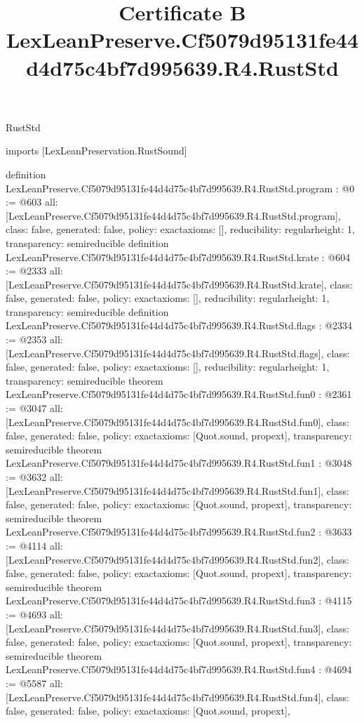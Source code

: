 \begin{lexlean}{RustStd}
\title{Certificate B LexLeanPreserve.Cf5079d95131fe44d4d75c4bf7d995639.R4.RustStd}
\begin{coremodule}
imports [LexLeanPreservation.RustSound]

definition LexLeanPreserve.Cf5079d95131fe44d4d75c4bf7d995639.R4.RustStd.program : @0 := @603 {
  all: [LexLeanPreserve.Cf5079d95131fe44d4d75c4bf7d995639.R4.RustStd.program],
  class: false,
  generated: false,
  policy: exact{axioms: []},
  reducibility: regular{height: 1},
  transparency: semireducible
}
definition LexLeanPreserve.Cf5079d95131fe44d4d75c4bf7d995639.R4.RustStd.krate : @604 := @2333 {
  all: [LexLeanPreserve.Cf5079d95131fe44d4d75c4bf7d995639.R4.RustStd.krate],
  class: false,
  generated: false,
  policy: exact{axioms: []},
  reducibility: regular{height: 1},
  transparency: semireducible
}
definition LexLeanPreserve.Cf5079d95131fe44d4d75c4bf7d995639.R4.RustStd.flags : @2334 := @2353 {
  all: [LexLeanPreserve.Cf5079d95131fe44d4d75c4bf7d995639.R4.RustStd.flags],
  class: false,
  generated: false,
  policy: exact{axioms: []},
  reducibility: regular{height: 1},
  transparency: semireducible
}
theorem LexLeanPreserve.Cf5079d95131fe44d4d75c4bf7d995639.R4.RustStd.fun0 : @2361 := @3047 {
  all: [LexLeanPreserve.Cf5079d95131fe44d4d75c4bf7d995639.R4.RustStd.fun0],
  class: false,
  generated: false,
  policy: exact{axioms: [Quot.sound, propext]},
  transparency: semireducible
}
theorem LexLeanPreserve.Cf5079d95131fe44d4d75c4bf7d995639.R4.RustStd.fun1 : @3048 := @3632 {
  all: [LexLeanPreserve.Cf5079d95131fe44d4d75c4bf7d995639.R4.RustStd.fun1],
  class: false,
  generated: false,
  policy: exact{axioms: [Quot.sound, propext]},
  transparency: semireducible
}
theorem LexLeanPreserve.Cf5079d95131fe44d4d75c4bf7d995639.R4.RustStd.fun2 : @3633 := @4114 {
  all: [LexLeanPreserve.Cf5079d95131fe44d4d75c4bf7d995639.R4.RustStd.fun2],
  class: false,
  generated: false,
  policy: exact{axioms: [Quot.sound, propext]},
  transparency: semireducible
}
theorem LexLeanPreserve.Cf5079d95131fe44d4d75c4bf7d995639.R4.RustStd.fun3 : @4115 := @4693 {
  all: [LexLeanPreserve.Cf5079d95131fe44d4d75c4bf7d995639.R4.RustStd.fun3],
  class: false,
  generated: false,
  policy: exact{axioms: [Quot.sound, propext]},
  transparency: semireducible
}
theorem LexLeanPreserve.Cf5079d95131fe44d4d75c4bf7d995639.R4.RustStd.fun4 : @4694 := @5587 {
  all: [LexLeanPreserve.Cf5079d95131fe44d4d75c4bf7d995639.R4.RustStd.fun4],
  class: false,
  generated: false,
  policy: exact{axioms: [Quot.sound, propext]},
}
\end{coremodule}
\end{lexlean}
